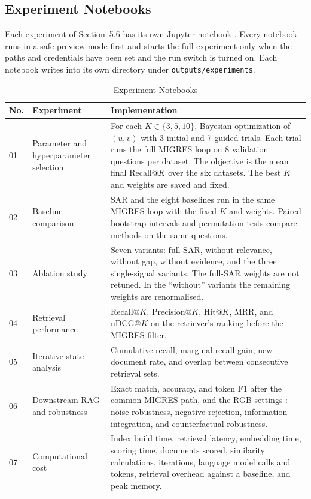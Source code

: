 \documentclass[12pt,a4paper]{report}
\begin{document}
\subsection{Experiment Notebooks}

Each experiment of Section~5.6 has its own Jupyter notebook \cite{kluyver2016jupyter}. Every notebook runs in a safe preview mode first and starts the full experiment only when the paths and credentials have been set and the run switch is turned on. Each notebook writes into its own directory under \texttt{outputs/experiments}.

\begin{table}[H]
\centering
\caption{Experiment Notebooks}
\label{tab:impl-notebooks}
\renewcommand{\arraystretch}{1.2}
\begin{tabular}{|p{0.35in}|p{1.55in}|p{4.0in}|}
\hline
\textbf{No.} & \textbf{Experiment} & \textbf{Implementation} \\ \hline
01 & Parameter and hyperparameter selection & For each $K\in\{3,5,10\}$, Bayesian optimization of $(u,v)$ with 3 initial and 7 guided trials. Each trial runs the full MIGRES loop on 8 validation questions per dataset. The objective is the mean final Recall@$K$ over the six datasets. The best $K$ and weights are saved and fixed. \\ \hline
02 & Baseline comparison & SAR and the eight baselines run in the same MIGRES loop with the fixed $K$ and weights. Paired bootstrap intervals \cite{efron1993bootstrap} and permutation tests \cite{smucker2007comparison} compare methods on the same questions. \\ \hline
03 & Ablation study & Seven variants: full SAR, without relevance, without gap, without evidence, and the three single-signal variants. The full-SAR weights are not retuned. In the ``without'' variants the remaining weights are renormalised. \\ \hline
04 & Retrieval performance & Recall@$K$, Precision@$K$, Hit@$K$, MRR, and nDCG@$K$ \cite{manning2008ir,jarvelin2002cumulated} on the retriever's ranking before the MIGRES filter. \\ \hline
05 & Iterative state analysis & Cumulative recall, marginal recall gain, new-document rate, and overlap between consecutive retrieval sets. \\ \hline
06 & Downstream RAG and robustness & Exact match, accuracy, and token F1 after the common MIGRES path, and the RGB settings \cite{chen2024rgb}: noise robustness, negative rejection, information integration, and counterfactual robustness. \\ \hline
07 & Computational cost & Index build time, retrieval latency, embedding time, scoring time, documents scored, similarity calculations, iterations, language model calls and tokens, retrieval overhead against a baseline, and peak memory. \\ \hline
\end{tabular}
\end{table}
\end{document}

